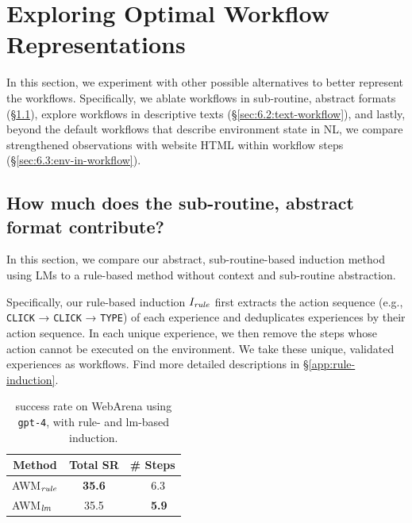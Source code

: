 \section{Exploring Optimal Workflow Representations}
\label{sec:6:alternative-workflows}

In this section, we experiment with other possible alternatives to better represent the workflows. Specifically, we ablate workflows in sub-routine, abstract formats (\S\ref{sec:6.1:format-ablation}), explore workflows in descriptive texts (\S\ref{sec:6.2:text-workflow}), and lastly, beyond the default workflows that describe environment state in NL, we compare strengthened observations with website HTML within workflow steps (\S\ref{sec:6.3:env-in-workflow}).



\subsection{How much does the sub-routine, abstract format contribute?}
\label{sec:6.1:format-ablation}

In this section, we compare our abstract, sub-routine-based induction method using LMs to a rule-based method without context and sub-routine abstraction.

Specifically, our rule-based induction $I_{\it rule}$ first extracts the action sequence (e.g., \texttt{CLICK} → \texttt{CLICK} → \texttt{TYPE}) of each experience and deduplicates experiences by their action sequence. In each unique experience, we then remove the steps whose action cannot be executed on the environment. We take these unique, validated experiences as workflows. Find more detailed descriptions in \S\ref{app:rule-induction}.


\begin{table}
\small
\vspace{-7mm}
\caption{\awm success rate on WebArena using \texttt{gpt-4}, with rule- and lm-based induction.}
\vspace{2mm}
\label{tab:webarena-rule-lm}
%
\begin{tabular}{l|cc}
\toprule
\multicolumn{1}{c|}{\bf Method} & {\bf Total SR} & {\bf \# Steps} \\
\midrule
\textsc{AWM$_{\it rule}$} & {\bf 35.6} & {~~6.3} \\
\textsc{AWM$_{\it lm}$} & {35.5} & {\bf ~~5.9} \\
\bottomrule
\end{tabular}
\vspace{-3mm}
\end{table}
%
